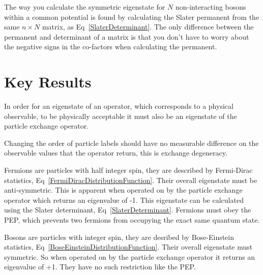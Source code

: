 \noindent The way you calculate the symmetric eigenstate for $N$ non-interacting bosons within a common potential is found by calculating the Slater permanent from the same $n \times N$ matrix, as Eq~\ref{SlaterDeterminant}. The only difference between the permanent and determinant of a matrix is that you don't have to worry about the negative signs in the co-factors when calculating the permanent.

\section{Key Results}

In order for an eigenstate of an operator, which corresponds to a physical observable, to be physically acceptable it must also be an eigenstate of the particle exchange operator.

\noindent Changing the order of particle labels should have no measurable difference on the observable values that the operator return, this is exchange degeneracy.

\noindent Fermions are particles with half integer spin, they are described by Fermi-Dirac statistics, Eq~\ref{FermiDiracDistributionFunction}. Their overall eigenstate must be anti-symmetric. This is apparent when operated on by the particle exchange operator which returns an eigenvalue of -1. This eigenstate can be calculated using the Slater determinant, Eq~\ref{SlaterDeterminant}. Fermions must obey the PEP, which prevents two fermions from occupying the exact same quantum state.

\noindent Bosons are particles with integer spin, they are desribed by Bose-Einstein statistics, Eq~\ref{BoseEinsteinDistributionFunction}. Their overall eigenstate must symmetric. So when operated on by the particle exchange operator it returns an eigenvalue of +1. They have no such restriction like the PEP.
